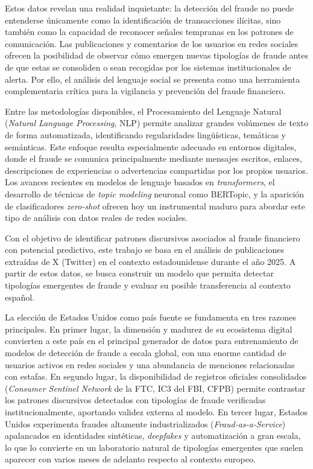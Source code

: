 Estos datos revelan una realidad inquietante: la detección del fraude no puede entenderse únicamente como la identificación de transacciones ilícitas, sino también como la capacidad de reconocer señales tempranas en los patrones de comunicación. Las publicaciones y comentarios de los usuarios en redes sociales ofrecen la posibilidad de observar cómo emergen nuevas tipologías de fraude antes de que estas se consoliden o sean recogidas por los sistemas institucionales de alerta. Por ello, el análisis del lenguaje social se presenta como una herramienta complementaria crítica para la vigilancia y prevención del fraude financiero.

Entre las metodologías disponibles, el Procesamiento del Lenguaje Natural (\textit{Natural Language Processing}, NLP) permite analizar grandes volúmenes de texto de forma automatizada, identificando regularidades lingüísticas, temáticas y semánticas. Este enfoque resulta especialmente adecuado en entornos digitales, donde el fraude se comunica principalmente mediante mensajes escritos, enlaces, descripciones de experiencias o advertencias compartidas por los propios usuarios. Los avances recientes en modelos de lenguaje basados en \textit{transformers}, el desarrollo de técnicas de \textit{topic modeling} neuronal como BERTopic, y la aparición de clasificadores \textit{zero-shot} ofrecen hoy un instrumental maduro para abordar este tipo de análisis con datos reales de redes sociales.

Con el objetivo de identificar patrones discursivos asociados al fraude financiero con potencial predictivo, este trabajo se basa en el análisis de publicaciones extraídas de X (Twitter) en el contexto estadounidense durante el año 2025. A partir de estos datos, se busca construir un modelo que permita detectar tipologías emergentes de fraude y evaluar su posible transferencia al contexto español.

La elección de Estados Unidos como país fuente se fundamenta en tres razones principales. En primer lugar, la dimensión y madurez de su ecosistema digital convierten a este país en el principal generador de datos para entrenamiento de modelos de detección de fraude a escala global, con una enorme cantidad de usuarios activos en redes sociales y una abundancia de menciones relacionadas con estafas. En segundo lugar, la disponibilidad de registros oficiales consolidados (\textit{Consumer Sentinel Network} de la FTC, IC3 del FBI, CFPB) permite contrastar los patrones discursivos detectados con tipologías de fraude verificadas institucionalmente, aportando validez externa al modelo. En tercer lugar, Estados Unidos experimenta fraudes altamente industrializados (\textit{Fraud-as-a-Service}) apalancados en identidades sintéticas, \textit{deepfakes} y automatización a gran escala, lo que lo convierte en un laboratorio natural de tipologías emergentes que suelen aparecer con varios meses de adelanto respecto al contexto europeo.


